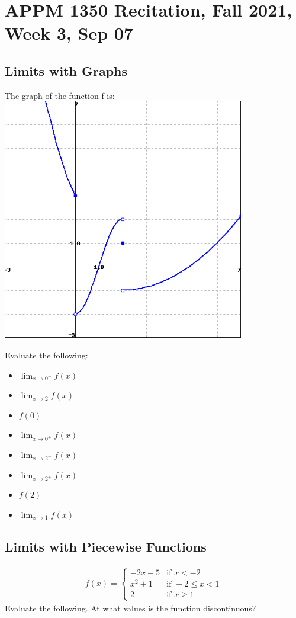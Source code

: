 \documentclass{article}
\begin{document}
\section*{APPM 1350 Recitation, Fall 2021, Week 3, Sep 07}
\vspace{0.5in}

\subsection*{Limits with Graphs}
The graph of the function f is:\\
\includegraphics[scale=0.4]{func}

Evaluate the following:
\setlength{\columnsep}{-2.1in}
\begin{multicols}{2}
	\begin{itemize}
		\item $\lim_{x \rightarrow 0^-} f(x)$
		\item $\lim_{x \rightarrow 2} f(x)$
		\item $f(0)$
		\item $\lim_{x \rightarrow 0^+} f(x)$
		\item $\lim_{x \rightarrow 2^-} f(x)$
		\item $\lim_{x \rightarrow 2^+} f(x)$
		\item $f(2)$
		\item $\lim_{x\to 1} f(x)$
	\end{itemize}
\end{multicols}

\vspace{2cm}
\subsection*{Limits with Piecewise Functions}
\begin{align*}
f(x) = \begin{cases} 
-2x-5 & \text{if } x<-2 \\
x^2+1 & \text{if } -2 \leq x < 1 \\
2 & \text{if } x \geq 1 
\end{cases}
\end{align*}
Evaluate the following. At what values is the function discontinuous? 
\end{document}
